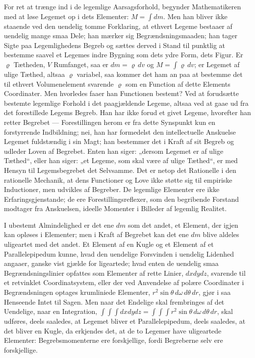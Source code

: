 \documentclass[12pt,a4paper]{book}
\begin{document}
For ret at trænge ind i de legemlige Aarsagsforhold, begynder
Mathematikeren med at løse Legemet op i dets Elementer: $M = \int dm$.
Men han bliver ikke staaende ved den uendelig tomme Forklaring, at
ethvert Legeme bestaaer af uendelig mange smaa Dele; han mærker sig
Begrændsningsmaaden; han tager Sigte paa Legemlighedens Begreb og
sættes derved i Stand til punktlig at bestemme saavel et Legemes indre
Bygning som dets ydre Form, dets Figur.
Er $\varrho$ Tætheden, $V$ Rumfanget, saa er $dm = \varrho\,dv$ og $M =
\int \varrho\,dv$; er Legemet af ulige Tæthed, altsaa $\varrho$
variabel, saa kommer det ham an paa at bestemme det til ethvert
Volumenelement svarende $\varrho$ som en Function af dette Elements
Coordinater. Men hvorledes faaer han Functionen bestemt? Ved at
forudsætte bestemte legemlige Forhold i det paagjældende Legeme, altsaa
ved at gaae ud fra det forestillede Legems Begreb. Han har ikke forud
et givet
Legeme, hvorefter han retter Begrebet --- Forestillingen herom er fra
dette Synspunkt kun en forstyrrende Indbildning; nei, han har
formedelst den intellectuelle Anskuelse Legemet fuldstændig i sin Magt;
han bestemmer det i Kraft af sit Begreb og udleder Loven af Begrebet.
Enten han siger: „dersom Legemet er af ulige Tæthed“, eller han siger:
„et Legeme, som skal være af ulige Tæthed“, er med Hensyn til
Legemsbegrebet det Selvsamme. Det er netop det Rationelle i den
rationelle Mechanik, at dens Functioner og Love ikke støtte sig til
empiriske Inductioner, men udvikles af Begreber. De legemlige
Elementer ere ikke Erfaringsgjenstande; de ere Forestillingsreflexer,
som den begribende Forstand modtager fra Anskuelsen, ideelle Momenter i
Billeder af legemlig Realitet.

I ubestemt Almindelighed er det ene $dm$ som det andet, et Element, der
igjen kan opløses i Elementer; men i Kraft af Begrebet kan det ene $dm$
blive aldeles uligeartet med det andet. Et Element af en Kugle og et
Element af et Parallelepipedum kunne, hvad den uendelige Forsvinden i
uendelig Lidenhed angaaer, ganske vist gjælde for ligeartede; hvad
enten de uendelig smaa Begrændsningslinier opfattes som Elementer af
rette Linier, $dxdydz$, svarende til et retvinklet Coordinatsystem,
eller der ved Anvendelse af polære Coordinater i Begrændsningen optages
krumliniede Elementer,
$r^{2}\sin\theta\,d\omega\,d\theta\,dr$, gjør i saa Henseende Intet til
Sagen. Men naar det Endelige skal frembringes af det Uendelige, naar
en Integration, $\int\int\int dxdydz =
\int\int\int r^{2}\sin\theta\,d\omega\,d\theta\,dr$, skal udføres,
deels saaledes, at Legemet bliver et Parallelepipedum, deels saaledes,
at det bliver en Kugle, da erkjendes det, at de to Legemer have
uligeartede Elementer: Begrebsmomenterne ere forskjellige, fordi
Begreberne selv ere forskjellige.
\end{document}
